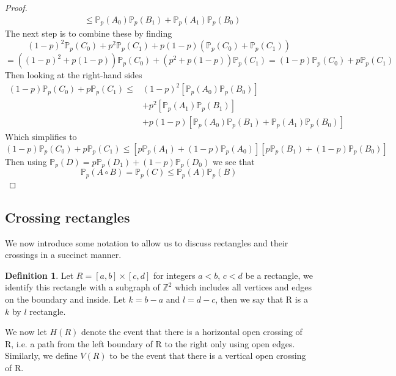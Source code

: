 \documentclass[a4paper,11pt]{article}
\newtheorem{corollary}[theorem]{Corollary}
\theoremstyle{definition}
\newtheorem{definition}[theorem]{Definition}
\newcommand{\ints}{\mathbb{Z}}
\newcommand{\prob}{\mathbb{P}_p}
\begin{document}
\begin{proof}
\begin{align*}
								&\leq \prob(A_0)\prob(B_1) + \prob(A_1)\prob(B_0)
	\end{align*}
	The next step is to combine these by finding 
	$$(1-p)^2\prob(C_0) + p^2\prob(C_1) + p(1-p)(\prob(C_0) + \prob(C_1))$$
	$$=((1-p)^2 + p(1-p))\prob(C_0) + (p^2 + p(1-p))\prob(C_1) = (1-p)\prob(C_0) + p\prob(C_1)$$
	Then looking at the right-hand sides
	\begin{align*}
		(1-p)\prob(C_0) + p\prob(C_1) \leq& (1-p)^2[\prob(A_0)\prob(B_0)]\\
		&+ p^2[\prob(A_1)\prob(B_1)]\\
		& +p(1-p)[\prob(A_0)\prob(B_1) + \prob(A_1)\prob(B_0)]
	\end{align*}
	Which simplifies to 
	$$(1-p)\prob(C_0) + p\prob(C_1) \leq [p\prob(A_1) + (1-p)\prob(A_0)][p\prob(B_1) + (1-p)\prob(B_0)]$$
	Then using $\prob(D) = p\prob(D_1) + (1-p)\prob(D_0)$ we see that
	$$\prob(A \circ B) = \prob(C) \leq \prob(A)\prob(B)$$

\end{proof}

\subsection{Crossing rectangles}

We now introduce some notation to allow us to discuss rectangles and their crossings in a succinct manner.
\begin{definition}
	Let $R = [a,b]\times[c, d]$ for integers $a<b$, $c<d$ be a rectangle, we identify this rectangle with a subgraph of $\ints^2$ which includes all vertices and edges on the boundary and inside. Let $k = b-a$ and $l = d-c$, then we say that R is a $k$ by $l$ rectangle.
	
	We now let $H(R)$ denote the event that there is a horizontal open crossing of R, i.e. a path from the left boundary of R to the right only using open edges. Similarly, we define $V(R)$ to be the event that there is a vertical open crossing of R. 
\end{definition}
\end{document}
